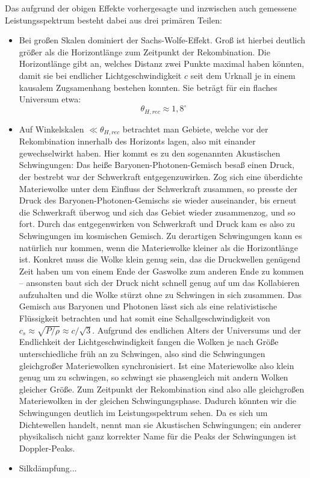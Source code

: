 \documentclass[10pt,a4paper]{article}
\begin{document}
Das aufgrund der obigen Effekte vorhergesagte und inzwischen auch gemessene Leistungsspektrum besteht dabei aus drei primären Teilen:
\begin{itemize}
\item Bei großen Skalen dominiert der Sachs-Wolfe-Effekt. Groß ist hierbei deutlich größer als die Horizontlänge zum Zeitpunkt der Rekombination. Die Horizontlänge gibt an, welches Distanz zwei Punkte maximal haben könnten, damit sie bei endlicher Lichtgeschwindigkeit $c$ seit dem Urknall je in einem kausalem Zugsamenhang bestehen konnten. Sie beträgt für ein flaches Universum etwa:
\[ \theta_{H,rec} \approx 1,8^\circ \]
\item Auf Winkelskalen $\ll\theta_{H,rec}$ betrachtet man Gebiete, welche vor der Rekombination innerhalb des Horizonts lagen, also mit einander gewechselwirkt haben. Hier kommt es zu den sogenannten Akustischen Schwingungen:
Das heiße Baryonen-Photonen-Gemisch besaß einen Druck, der bestrebt war der Schwerkraft entgegenzuwirken. Zog sich eine überdichte Materiewolke unter dem Einfluss der Schwerkraft zusammen, so presste der Druck des Baryonen-Photonen-Gemischs sie wieder auseinander, bis erneut die Schwerkraft überwog und sich das Gebiet wieder zusammenzog, und so fort. Durch das entgegenwirken von Schwerkraft und Druck kam es also zu Schwingungen im kosmischen Gemisch.
Zu derartigen Schwingungen kann es natürlich nur kommen, wenn die Materiewolke kleiner als die Horizontlänge ist. Konkret muss die Wolke klein genug sein, das die Druckwellen genügend Zeit haben um von einem Ende der Gaswolke zum anderen Ende zu kommen -- ansonsten baut sich der Druck nicht schnell genug auf um das Kollabieren aufzuhalten und die Wolke stürzt ohne zu Schwingen in sich zusammen. Das Gemisch aus Baryonen und Photonen lässt sich als eine relativistische Flüssigkeit betrachten und hat somit eine Schallgeschwindigkeit von $c_s\approx\sqrt{P/\rho}\approx c/\sqrt{3}$.\cite{Schneider}
Aufgrund des endlichen Alters der Universums und der Endlichkeit der Lichtgeschwindigkeit fangen die Wolken je nach Größe unterschiedliche früh an zu Schwingen, also sind die Schwingungen gleichgroßer Materiewolken synchronisiert. Ist eine Materiewolke also klein genug um zu schwingen, so schwingt sie phasengleich mit andern Wolken gleicher Größe. Zum Zeitpunkt der Rekombination sind also alle gleichgroßen Materiewolken in der gleichen Schwingungsphase. Dadurch könnten wir die Schwingungen deutlich im Leistungsspektrum sehen. Da es sich um Dichtewellen handelt, nennt man sie Akustischen Schwingungen; ein anderer physikalisch nicht ganz korrekter Name für die Peaks der Schwingungen ist Doppler-Peaks.
\item Silkdämpfung...
\end{itemize}
\end{document}

